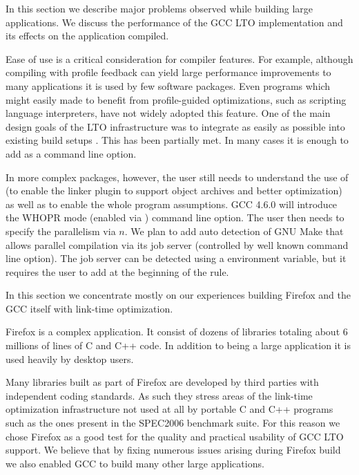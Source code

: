 \documentclass[final]{ols}
\begin{document}
In this section we describe major problems observed while building large
applications.  We discuss the performance of the GCC LTO implementation and its
effects on the application compiled.

Ease of use is a critical consideration for compiler features.  For example,
although compiling with profile feedback can yield large performance
improvements to many applications \cite{naspaer} it is used by few software
packages.  Even programs which might easily made to benefit from profile-guided
optimizations, such as scripting language interpreters, have not widely adopted
this feature. One of the main design goals of the LTO infrastructure was to
integrate as easily as possible into existing build setups \cite{LTOproposal,
WHOPR}.  This has been partially met.  In many cases it is enough to add
 as a command line option.  

In more complex packages, however, the user still needs to understand the use of
 (to enable the linker plugin to support object
archives and better optimization) as well as  to enable
the whole program assumptions.  GCC 4.6.0 will introduce the WHOPR mode (enabled via
) command line option. The user then needs to specify the parallelism
via $n$.  We plan to add auto detection of GNU Make that allows
parallel compilation via its job server (controlled by well known 
command line option).  The job server can be detected using a environment
variable, but it requires the user to add \code{+} at the beginning of the  rule.

In this section we concentrate mostly on our experiences building Firefox
and the GCC itself with link-time optimization.

Firefox is a complex application. It consist of dozens of libraries totaling
about 6 millions of lines of C and C++ code.  In addition to being a large
application it is used heavily by desktop users.

Many libraries built as part of Firefox are developed by third parties with
independent coding standards.  As such they stress areas of the link-time
optimization infrastructure not used at all by portable C and C++ programs
such as the ones present in the SPEC2006 benchmark suite.  For this reason we chose Firefox
as a good test for the quality and practical usability of GCC LTO support.  We
believe that by fixing numerous issues arising during Firefox build we also
enabled GCC to build many other large applications.
\end{document}
